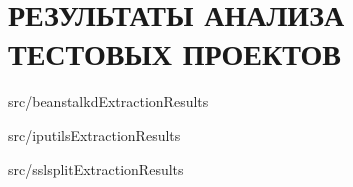 \chapter{РЕЗУЛЬТАТЫ АНАЛИЗА ТЕСТОВЫХ ПРОЕКТОВ}
\label{app:results}

{src/beanstalkdExtractionResults}


{src/iputilsExtractionResults}


{src/sslsplitExtractionResults}